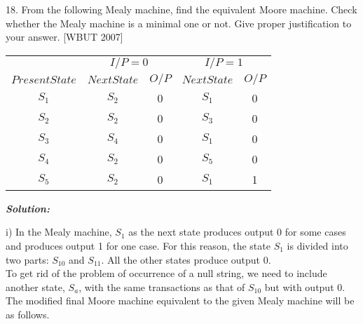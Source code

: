 \documentclass[8pt]{beamer}
\begin{document}
\begin{frame}
18. From the following Mealy machine, find the equivalent Moore machine. Check whether the Mealy
machine is a minimal one or not. Give proper justification to your answer. \hspace*{7cm} [WBUT 2007]\\

\begin{center}
\begin{tabular}{ccccc}
 \hline

 \hline

 \hline

 \hline
 &  \multicolumn{2}{c}{$I/P = 0$ } &  \multicolumn{2}{c}{$I/P = 1$}  \\
  \cline{2-3}                         \cline{4-5}
 $Present State$ &   $Next State$  & $O/P$ &  $Next State$  & $O/P$\\
\hline
$S_1$ & $S_2$ & 0 & $S_1$ &0\\
$S_2$ & $S_2$ & 0 & $S_3$ &0\\
$S_3$ & $S_4$ & 0 & $S_1$ &0\\
$S_4$ & $S_2$ & 0 & $S_5$ &0\\
$S_5$ & $S_2$ & 0 & $S_1$ &1\\

 \hline

 \hline

 \hline

 \hline
\end{tabular}
\end{center}

\vspace*{0.3cm}
\end{frame}

\begin{frame}
\emph{
\textbf{Solution:}\\
}

i) In the Mealy machine, $S_1$ as the next state produces output 0 for some cases and produces
output 1 for one case. For this reason, the state $S_1$ is divided into two parts: $S_10$ and $S_11$. All the
other states produce output 0.\\
To get rid of the problem of occurrence of a null string, we need to include another state, $S_a$,
with the same transactions as that of $S_10$ but with output 0.\\
\hspace*{0.5cm} The modified final Moore machine equivalent to the given Mealy machine will be as follows.\\
\end{frame}
\end{document}
